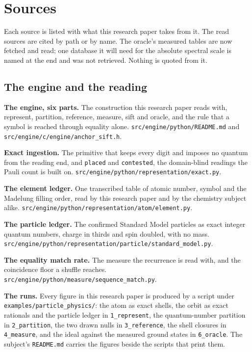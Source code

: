 \chapter{Sources}

Each source is listed with what this research paper takes from it. The read sources are cited by path or by name.
The oracle's measured tables are now fetched and read; one database it will need for the absolute
spectral scale is named at the end and was not retrieved. Nothing is quoted from it.

\section*{The engine and the reading}

\textbf{The engine, six parts.} The construction this research paper reads with, represent, partition,
reference, measure, sift and oracle, and the rule that a symbol is reached through equality alone.
\texttt{src/\allowbreak{}engine/\allowbreak{}python/\allowbreak{}README.md} and
\texttt{src/\allowbreak{}engine/\allowbreak{}c/\allowbreak{}engine/\allowbreak{}anchor\_sift.h}.

\textbf{Exact ingestion.} The primitive that keeps every digit and imposes no quantum from the reading
end, and \texttt{placed} and \texttt{contested}, the domain-blind readings the Pauli count is built
on. \texttt{src/\allowbreak{}engine/\allowbreak{}python/\allowbreak{}representation/\allowbreak{}exact.py}.

\textbf{The element ledger.} One transcribed table of atomic number, symbol and the Madelung filling
order, read by this research paper and by the chemistry subject alike.
\texttt{src/\allowbreak{}engine/\allowbreak{}python/\allowbreak{}representation/\allowbreak{}atom/\allowbreak{}element.py}.

\textbf{The particle ledger.} The confirmed Standard Model particles as exact integer quantum numbers,
charge in thirds and spin doubled, with no mass.
\texttt{src/\allowbreak{}engine/\allowbreak{}python/\allowbreak{}representation/\allowbreak{}particle/\allowbreak{}standard\_model.py}.

\textbf{The equality match rate.} The measure the recurrence is read with, and the coincidence floor a
shuffle reaches.
\texttt{src/\allowbreak{}engine/\allowbreak{}python/\allowbreak{}measure/\allowbreak{}sequence\_match.py}.

\textbf{The runs.} Every figure in this research paper is produced by a script under
\texttt{examples/\allowbreak{}particle\_physics/}: the atom as exact shells, the orbit as exact
rationals and the particle ledger in \texttt{1\_represent}, the quantum-number partition in
\texttt{2\_partition}, the two drawn nulls in \texttt{3\_reference}, the shell closures in
\texttt{4\_measure}, and the ideal against the measured ground states in \texttt{6\_oracle}. The
subject's \texttt{README.md} carries the figures beside the scripts that print them.


